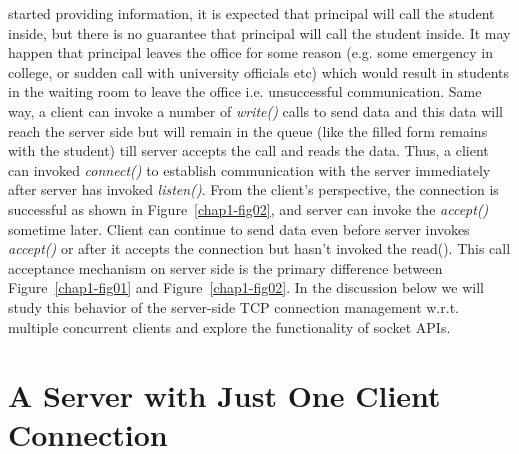 \begin{multicols}{2}
started providing information, it is expected that principal will call the student inside, but there is no guarantee that principal will call the student inside. It may happen that principal leaves the office for some reason (e.g. some emergency in college, or sudden call with university officials etc) which would result in students in the waiting room to leave the office i.e. unsuccessful communication. Same way, a client can invoke a number of \textit{write()} calls to send data and this data will reach the server side but will remain in the queue (like the filled form remains with the student) till server accepts the call and reads the data. Thus, a client can invoked \textit{connect()} to establish communication with the server immediately after server has invoked \textit{listen()}. From the client’s perspective, the connection is successful as shown in Figure~\ref{chap1-fig02}, and server can invoke the \textit{accept()} sometime later. Client can continue to send data even before server invokes \textit{accept()} or after it accepts the connection but hasn’t invoked the read(). This call acceptance mechanism on server side is the primary difference between Figure~\ref{chap1-fig01} and Figure~\ref{chap1-fig02}. In the discussion below we will study this behavior of the server-side TCP connection management w.r.t. multiple concurrent clients and explore the functionality of socket APIs.


\section{A Server with Just One Client Connection}


\end{multicols}
